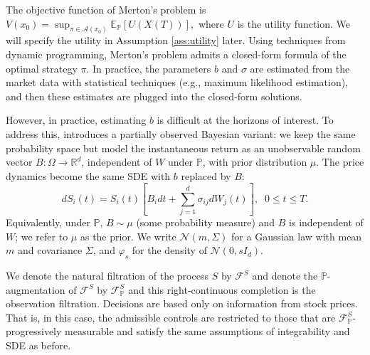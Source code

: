 \documentclass[11pt]{article}
\theoremstyle{definition}
\begin{document}
The objective function of Merton's problem is $V(x_0) = \sup_{\pi \in \mathcal{A}(x_0)}\mathbb{E}_{\mathbb{P}}\left[U(X(T))\right],$ 
where $U$ is the utility function. We will specify the utility in Assumption \ref{ass:utility} later. %
Using techniques from dynamic programming, Merton's problem admits a closed-form formula of the optimal strategy $\pi$. In practice, the parameters $b$ and $\sigma$ are estimated from the market data with statistical techniques (e.g., maximum likelihood estimation), and then these estimates are plugged into the closed-form solutions.

However, in practice, estimating $b$ is difficult at the horizons of interest. To address this, \cite{KZ98} introduces a partially observed Bayesian variant: we keep the same probability space but model the instantaneous return as an unobservable random vector $B: \Omega \to \mathbb{R}^d$, independent of $W$ under $\mathbb{P}$, with prior distribution $\mu$. The price dynamics become the same SDE with $b$ replaced by $B$:
\begin{equation}\label{stock}
 d S_{i}(t) = S_{i}(t)\left[B_idt + \sum_{j=1}^d\sigma_{ij}dW_{j}(t)\right],\;\; 0 \leq t \leq T.  
\end{equation}
Equivalently, under $\mathbb P$, $B\sim\mu$ (some probability measure) and $B$ is independent of $W$; we refer to $\mu$ as the prior. We write $\mathcal N(m,\Sigma)$ for a Gaussian law with mean $m$ and covariance $\Sigma$, and $\varphi_s$ for the density of $\mathcal N(0, s I_d)$.



We denote the natural filtration of the process $S$ by $\mathcal{F}^S$ and denote the $\mathbb{P}$-augmentation of $\mathcal{F}^S$ by $\mathcal{F}^S_{\mathbb{P}}$ and this right-continuous completion is the observation filtration. Decisions are based only on information from stock prices. That is, in this case, the admissible controls are restricted to those that are $\mathcal{F}^S_{\mathbb{P}}$-progressively measurable and satisfy the same assumptions of integrability and SDE as before.
\end{document}
